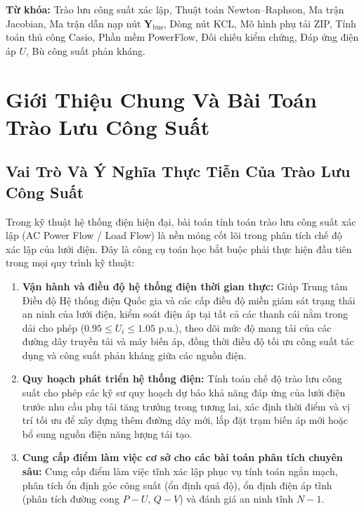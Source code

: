\documentclass[12pt,a4paper,oneside]{report}
\begin{document}
\noindent \textbf{Từ khóa:} Trào lưu công suất xác lập, Thuật toán Newton--Raphson, Ma trận Jacobian, Ma trận dẫn nạp nút $\mathbf{Y}_{\text{bus}}$, Dòng nút KCL, Mô hình phụ tải ZIP, Tính toán thủ công Casio, Phần mềm PowerFlow, Đối chiếu kiểm chứng, Đáp ứng điện áp $U$, Bù công suất phản kháng.

\newpage

\tableofcontents
\newpage
\listoffigures
\newpage
\listoftables
\newpage
{}
\setcounter{page}{1}

\chapter{Giới Thiệu Chung Và Bài Toán Trào Lưu Công Suất}

\section{Vai Trò Và Ý Nghĩa Thực Tiễn Của Trào Lưu Công Suất}
Trong kỹ thuật hệ thống điện hiện đại, bài toán tính toán trào lưu công suất xác lập (AC Power Flow / Load Flow) là nền móng cốt lõi trong phân tích chế độ xác lập của lưới điện. Đây là công cụ toán học bắt buộc phải thực hiện đầu tiên trong mọi quy trình kỹ thuật:
\begin{enumerate}
    \item \textbf{Vận hành và điều độ hệ thống điện thời gian thực:} Giúp Trung tâm Điều độ Hệ thống điện Quốc gia và các cấp điều độ miền giám sát trạng thái an ninh của lưới điện, kiểm soát điện áp tại tất cả các thanh cái nằm trong dải cho phép ($0.95 \le U_i \le 1.05\text{ p.u.}$), theo dõi mức độ mang tải của các đường dây truyền tải và máy biến áp, đồng thời điều độ tối ưu công suất tác dụng và công suất phản kháng giữa các nguồn điện.
    \item \textbf{Quy hoạch phát triển hệ thống điện:} Tính toán chế độ trào lưu công suất cho phép các kỹ sư quy hoạch dự báo khả năng đáp ứng của lưới điện trước nhu cầu phụ tải tăng trưởng trong tương lai, xác định thời điểm và vị trí tối ưu để xây dựng thêm đường dây mới, lắp đặt trạm biến áp mới hoặc bổ sung nguồn điện năng lượng tái tạo.
    \item \textbf{Cung cấp điểm làm việc cơ sở cho các bài toán phân tích chuyên sâu:} Cung cấp điểm làm việc tĩnh xác lập phục vụ tính toán ngắn mạch, phân tích ổn định góc công suất (ổn định quá độ), ổn định điện áp tĩnh (phân tích đường cong $P-U$, $Q-V$) và đánh giá an ninh tĩnh $N-1$.
\end{enumerate}
\end{document}
